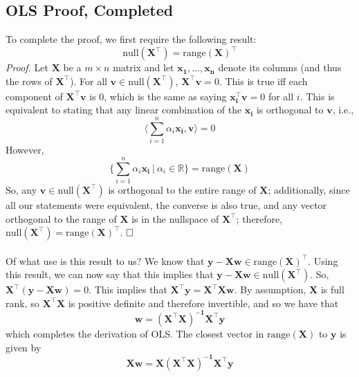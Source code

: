 \documentclass{article}
\begin{document}
\subsection{OLS Proof, Completed}
To complete the proof, we first require the following result:
$$ \text{null}(\mathbf{X}^{\top}) = \text{range}(\mathbf{X})^{\top}$$
\textit{Proof.} Let $\mathbf{X}$ be a $m \times n$ matrix and let $\mathbf{x_1, \ldots, x_n}$ denote its columns (and thus the rows of $\mathbf{X^{\top}}$). For all $\mathbf{v} \in \text{null}(\mathbf{X^{\top}})$, $\mathbf{X^{\top}v} = 0$. This is true iff each component of $\mathbf{X^{\top}v}$ is 0, which is the same as saying $\mathbf{x_i^{\top}v} = 0$ for all $i$. This is equivalent to stating that any linear combination of the $\mathbf{x_i}$ is orthogonal to $\mathbf{v}$, i.e., $$\langle \sum\limits_{i=1}^n \alpha_i\mathbf{x_i}, \mathbf{v} \rangle = 0$$ However, $$\{\sum\limits_{i=1}^n \alpha_i\mathbf{x_i}\ |\ \alpha_i \in \mathbb{R}\} = \text{range}(\mathbf{X})$$ So, any $\mathbf{v} \in \text{null}(\mathbf{X^{\top}})$ is orthogonal to the entire range of $\mathbf{X}$; additionally, since all our statements were equivalent, the converse is also true, and any vector orthogonal to the range of $\mathbf{X}$ is in the nullspace of $\mathbf{X^{\top}}$; therefore, 
$\text{null}(\mathbf{X}^{\top}) = \text{range}(\mathbf{X})^{\top}$. $\hfill\square$\\\\
Of what use is this result to us? We know that $\mathbf{y - Xw} \in \text{range}(\mathbf{X})^{\top}$. Using this result, we can now say that this implies that $\mathbf{y - Xw} \in \text{null}(\mathbf{X^{\top}})$. So, $\mathbf{X^{\top}(y - Xw)} = 0$. This implies that $\mathbf{X^{\top}y} = \mathbf{X^{\top}Xw}$. By assumption, $\mathbf{X}$ is full rank, so $\mathbf{X^{\top}X}$ is positive definite and therefore invertible, and so we have that $$\mathbf{w} = \mathbf{(X^{\top}X)^{-1}X^{\top}y}$$ which completes the derivation of OLS. The closest vector in $\text{range}(\mathbf{X})$ to $\mathbf{y}$ is given by $$\mathbf{Xw} = \mathbf{X(X^{\top}X)^{-1}X^{\top}y}$$
\end{document}
